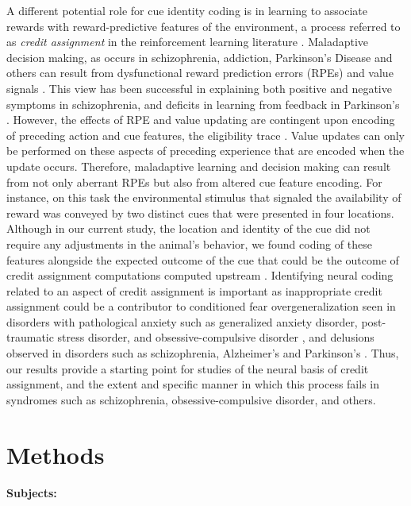 \documentclass[11pt]{article}
\let\cite=\citep
\begin{document}
A different potential role for cue identity coding is in learning to
associate rewards with reward-predictive features of the environment,
a process referred to as {\it credit assignment} in the reinforcement
learning literature \cite{sutton1998}. Maladaptive decision making, as
occurs in schizophrenia, addiction, Parkinson's Disease and others can
result from dysfunctional reward prediction errors (RPEs) and value
signals \cite{Frank2004,Gradin2011,Maia2011}. This view has been
successful in explaining both positive and negative symptoms in
schizophrenia, and deficits in learning from feedback in Parkinson's
\cite{Frank2004,Gradin2011}. However, the effects of RPE and value
updating are contingent upon encoding of preceding action and cue
features, the eligibility trace \cite{sutton1998,Lee2012}. Value
updates can only be performed on these aspects of preceding experience
that are encoded when the update occurs. Therefore, maladaptive
learning and decision making can result from not only aberrant RPEs
but also from altered cue feature encoding. For instance, on this task
the environmental stimulus that signaled the availability of reward
was conveyed by two distinct cues that were presented in four
locations. Although in our current study, the location and identity of
the cue did not require any adjustments in the animal’s behavior, we
found coding of these features alongside the expected outcome of the
cue that could be the outcome of credit assignment computations
computed upstream
\cite{Chau2015,Akaishi2016,Asaad2017,Noonan2017}. Identifying neural
coding related to an aspect of credit assignment is important as
inappropriate credit assignment could be a contributor to conditioned
fear overgeneralization seen in disorders with pathological anxiety
such as generalized anxiety disorder, post-traumatic stress disorder,
and obsessive-compulsive disorder
\cite{Kaczkurkin2013,Lissek2014,Kaczkurkin2017}, and delusions
observed in disorders such as schizophrenia, Alzheimer's and
Parkinson's \cite{Kapur2003,Corlett2010}. Thus, our results provide a
starting point for studies of the neural basis of credit assignment,
and the extent and specific manner in which this process fails in
syndromes such as schizophrenia, obsessive-compulsive disorder, and
others.

\section*{Methods}

{\bf Subjects:}
\end{document}
